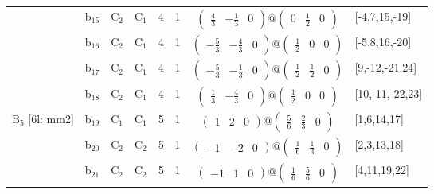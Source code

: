 \documentclass[fleqn,10pt,landscape]{article}
\begin{document}
\begin{itemize}
\begin{center}
\begin{longtable}{cc|cc|c|c|c|l}
& b$_{15}$ & C$_{2}$ & C$_{1}$ & 4 & 1 & $\begin{pmatrix} \frac{4}{3} & - \frac{1}{3} & 0 \end{pmatrix}@\begin{pmatrix} 0 & \frac{1}{2} & 0 \end{pmatrix}$ & [-4,7,15,-19] \\
& b$_{16}$ & C$_{2}$ & C$_{1}$ & 4 & 1 & $\begin{pmatrix} - \frac{5}{3} & - \frac{4}{3} & 0 \end{pmatrix}@\begin{pmatrix} \frac{1}{2} & 0 & 0 \end{pmatrix}$ & [-5,8,16,-20] \\
& b$_{17}$ & C$_{2}$ & C$_{1}$ & 4 & 1 & $\begin{pmatrix} - \frac{5}{3} & - \frac{1}{3} & 0 \end{pmatrix}@\begin{pmatrix} \frac{1}{2} & \frac{1}{2} & 0 \end{pmatrix}$ & [9,-12,-21,24] \\
& b$_{18}$ & C$_{2}$ & C$_{1}$ & 4 & 1 & $\begin{pmatrix} \frac{1}{3} & - \frac{4}{3} & 0 \end{pmatrix}@\begin{pmatrix} \frac{1}{2} & 0 & 0 \end{pmatrix}$ & [10,-11,-22,23] \\ \hline
B$_{5}$ [6l: mm2] & b$_{19}$ & C$_{1}$ & C$_{1}$ & 5 & 1 & $\begin{pmatrix} 1 & 2 & 0 \end{pmatrix}@\begin{pmatrix} \frac{5}{6} & \frac{2}{3} & 0 \end{pmatrix}$ & [1,6,14,17] \\
& b$_{20}$ & C$_{2}$ & C$_{2}$ & 5 & 1 & $\begin{pmatrix} -1 & -2 & 0 \end{pmatrix}@\begin{pmatrix} \frac{1}{6} & \frac{1}{3} & 0 \end{pmatrix}$ & [2,3,13,18] \\
& b$_{21}$ & C$_{2}$ & C$_{2}$ & 5 & 1 & $\begin{pmatrix} -1 & 1 & 0 \end{pmatrix}@\begin{pmatrix} \frac{1}{6} & \frac{5}{6} & 0 \end{pmatrix}$ & [4,11,19,22] \\

\end{longtable}
\end{center}
\end{itemize}
\end{document}
